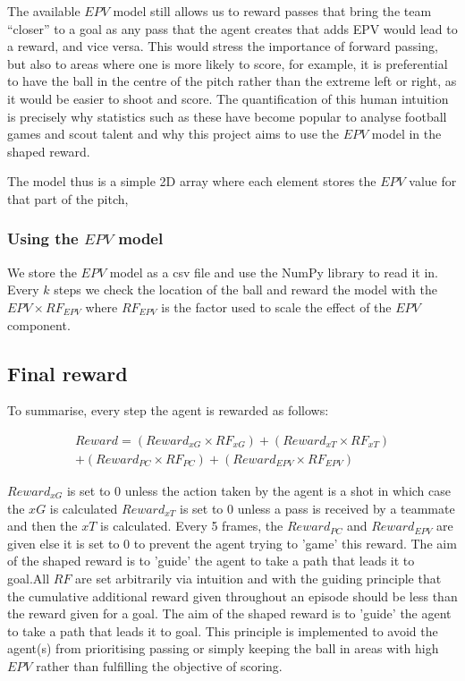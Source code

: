 \documentclass[11pt]{article}
\begin{document}
The available $EPV$ model still allows us to reward passes that bring the team “closer” to a goal as any pass that the agent creates that adds EPV would lead to a reward, and vice versa. This would stress the importance of forward passing, but also to areas where one is more likely to score, for example, it is preferential to have the ball in the centre of the pitch rather than the extreme left or right, as it would be easier to shoot and score.
The quantification of this human intuition is precisely why statistics such as these have become popular to analyse football games and scout talent and why this project aims to use the $EPV$ model in the shaped reward.

The model thus is a simple 2D array where each element stores the $EPV$ value for that part of the pitch,

\subsubsection{Using the $EPV$ model}
We store the $EPV$ model as a csv file and use the NumPy library to read it in. Every $k$ steps we check the location of the ball and reward the model with the $EPV \times RF_{EPV}$ where $RF_{EPV}$ is the factor used to scale the effect of the $EPV$ component. 

\subsection{Final reward}
To summarise, every step the agent is rewarded as follows:

\begin{multline}
    Reward = (Reward_{xG} \times RF_{xG}) + (Reward_{xT} \times RF_{xT}) \\
    + (Reward_{PC} \times RF_{PC}) + (Reward_{EPV} \times RF_{EPV})
\end{multline}

$Reward_{xG}$ is set to 0 unless the action taken by the agent is a shot in which case the $xG$ is calculated $Reward_{xT}$ is set to 0 unless a pass is received by a teammate and then the $xT$ is calculated. Every 5 frames, the $Reward_{PC}$ and $Reward_{EPV}$ are given else it is set to 0 to prevent the agent trying to 'game' this reward. The aim of the shaped reward is to 'guide' the agent to take a path that leads it to goal.All $RF$ are set arbitrarily via intuition and with the guiding principle that the cumulative additional reward given throughout an episode should be less than the reward given for a goal. The aim of the shaped reward is to 'guide' the agent to take a path that leads it to goal. This principle is implemented to avoid the agent(s) from prioritising passing or simply keeping the ball in areas with high $EPV$ rather than fulfilling the objective of scoring.
\end{document}
